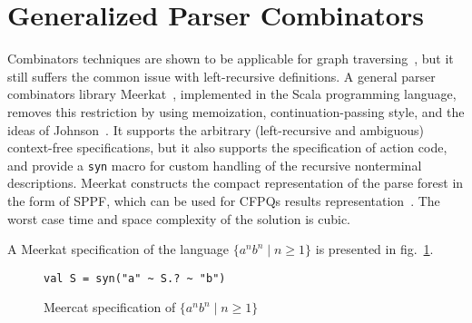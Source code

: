 \section{Generalized Parser Combinators}
\label{sec:GLL}

Combinators techniques are shown to be applicable for graph traversing~\cite{ScalaGraphParsing}, but it still suffers the common issue with left-recursive definitions.
A general parser combinators library Meerkat~\cite{Meerkat}, implemented in the Scala programming language, removes this restriction by using memoization, continuation-passing style, and the ideas of Johnson~\cite{Johnson}.
It supports the arbitrary (left-recursive and ambiguous) context-free specifications, but it also supports the specification of action code, and provide a \lstinline{syn} macro for custom handling of the recursive nonterminal descriptions.
Meerkat constructs the compact representation of the parse forest in the form of SPPF, which can be used for CFPQs results representation~\cite{GrigorevR16}.
The worst case time and space complexity of the solution is cubic.


A Meerkat specification of the language $\{a^n b^n \mid n \geq 1\}$ is presented in fig.~\ref{fig:anbnMeerkat}.


\begin{figure}[h]
\begin{lstlisting}
val S = syn("a" ~ S.? ~ "b")
\end{lstlisting}
\caption{Meercat specification of $\{a^n b^n \mid n \geq 1\}$}
\label{fig:anbnMeerkat}
\end{figure}

